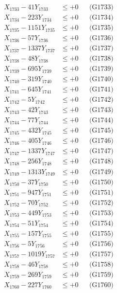 \documentclass[a4paper,10pt]{article}
\begin{document}
{\begin{align}
X_{1733} - 41Y_{1733} &\leq +0 && \text{(G1733)} \\
X_{1734} - 223Y_{1734} &\leq +0 && \text{(G1734)} \\
X_{1735} - 1151Y_{1735} &\leq +0 && \text{(G1735)} \\
X_{1736} - 57Y_{1736} &\leq +0 && \text{(G1736)} \\
X_{1737} - 1337Y_{1737} &\leq +0 && \text{(G1737)} \\
X_{1738} - 48Y_{1738} &\leq +0 && \text{(G1738)} \\
X_{1739} - 695Y_{1739} &\leq +0 && \text{(G1739)} \\
X_{1740} - 319Y_{1740} &\leq +0 && \text{(G1740)} \\
\allowbreak
X_{1741} - 645Y_{1741} &\leq +0 && \text{(G1741)} \\
X_{1742} - 5Y_{1742} &\leq +0 && \text{(G1742)} \\
X_{1743} - 42Y_{1743} &\leq +0 && \text{(G1743)} \\
X_{1744} - 77Y_{1744} &\leq +0 && \text{(G1744)} \\
X_{1745} - 432Y_{1745} &\leq +0 && \text{(G1745)} \\
X_{1746} - 405Y_{1746} &\leq +0 && \text{(G1746)} \\
X_{1747} - 1337Y_{1747} &\leq +0 && \text{(G1747)} \\
X_{1748} - 256Y_{1748} &\leq +0 && \text{(G1748)} \\
X_{1749} - 1313Y_{1749} &\leq +0 && \text{(G1749)} \\
X_{1750} - 37Y_{1750} &\leq +0 && \text{(G1750)} \\
\allowbreak
X_{1751} - 947Y_{1751} &\leq +0 && \text{(G1751)} \\
X_{1752} - 70Y_{1752} &\leq +0 && \text{(G1752)} \\
X_{1753} - 449Y_{1753} &\leq +0 && \text{(G1753)} \\
X_{1754} - 51Y_{1754} &\leq +0 && \text{(G1754)} \\
X_{1755} - 157Y_{1755} &\leq +0 && \text{(G1755)} \\
X_{1756} - 5Y_{1756} &\leq +0 && \text{(G1756)} \\
X_{1757} - 1019Y_{1757} &\leq +0 && \text{(G1757)} \\
X_{1758} - 46Y_{1758} &\leq +0 && \text{(G1758)} \\
X_{1759} - 269Y_{1759} &\leq +0 && \text{(G1759)} \\
X_{1760} - 227Y_{1760} &\leq +0 && \text{(G1760)} \\

\end{align}}
\end{document}
